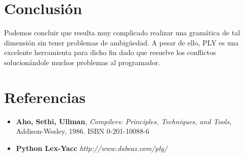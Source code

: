 \documentclass[10pt,a4paper]{article}
\begin{document}
\section{Conclusión}
Podemos concluir que resulta muy complicado realizar una gramática de tal dimensión sin tener problemas de ambigüedad. A pesar de ello, PLY es una excelente herramienta para dicho fin dado que resuelve los conflictos solucionándole muchos problemas al programador.

\section{Referencias}
\begin{itemize}
\item \textbf{Aho, Sethi, Ullman}, \textit{Compilers: Principles, Techniques, and Tools}, Addison-Wesley, 1986. ISBN 0-201-10088-6

\item \textbf{Python Lex-Yacc} \textit{http://www.dabeaz.com/ply/}
\end{itemize}
\end{document}
